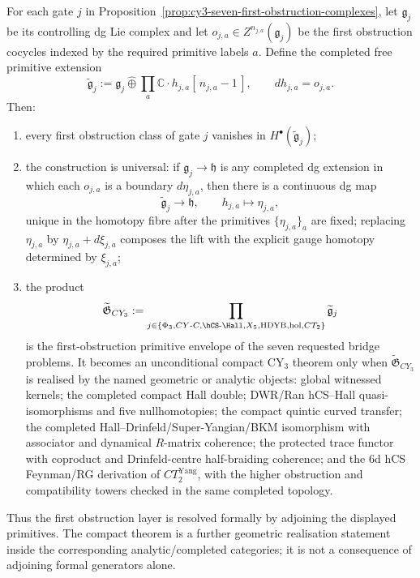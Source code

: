 \begin{theorem}
\label{thm:cy3-universal-primitive-envelope}
For each gate $j$ in
Proposition~\ref{prop:cy3-seven-first-obstruction-complexes}, let
$\mathfrak g_j$ be its controlling dg Lie complex and let
$o_{j,a}\in Z^{n_{j,a}}(\mathfrak g_j)$ be the first obstruction
cocycles indexed by the required primitive labels $a$. Define the
completed free primitive extension
\[
 \widetilde{\mathfrak g}_j
 :=
 \mathfrak g_j
 \widehat{\oplus}
 \prod_a \mathbb C\cdot h_{j,a}[\,n_{j,a}-1\,],
 \qquad
 d h_{j,a}=o_{j,a}.
\]
Then:
\begin{enumerate}[label=\textup{(\roman*)}]
\item every first obstruction class of gate $j$ vanishes in
$H^\bullet(\widetilde{\mathfrak g}_j)$;
\item the construction is universal: if
$\mathfrak g_j\to \mathfrak h$ is any completed dg extension in which
each $o_{j,a}$ is a boundary $d\eta_{j,a}$, then there is a continuous
dg map
\[
 \widetilde{\mathfrak g}_j\longrightarrow\mathfrak h,\qquad
 h_{j,a}\longmapsto \eta_{j,a},
\]
unique in the homotopy fibre after the primitives
$\{\eta_{j,a}\}_a$ are fixed; replacing
$\eta_{j,a}$ by $\eta_{j,a}+d\xi_{j,a}$ composes the lift with the
explicit gauge homotopy determined by $\xi_{j,a}$;
\item the product
\[
 \widetilde{\mathfrak G}_{CY_3}
 :=
 \prod_{j\in\{\Phi_3,CY\textup{-}C,\hCS\textup{-}\Hall,
 X_5,\mathrm{HDYB},\mathrm{hol},CT_2\}}
 \widetilde{\mathfrak g}_j
\]
is the first-obstruction primitive envelope of the seven requested bridge
problems. It becomes an unconditional compact CY$_3$ theorem only when
$\widetilde{\mathfrak G}_{CY_3}$ is realised by the named geometric or
analytic objects: global witnessed kernels; the completed compact Hall
double; DWR/Ran hCS--Hall quasi-isomorphisms and five nullhomotopies;
the compact quintic curved transfer; the completed
Hall--Drinfeld/Super-Yangian/BKM isomorphism with associator and
dynamical $R$-matrix coherence; the protected trace functor with
coproduct and Drinfeld-centre half-braiding coherence; and the 6d hCS
Feynman/RG derivation of
$CT_2^{\mathrm{Yang}}$, with the higher obstruction and compatibility
towers checked in the same completed topology.
\end{enumerate}
Thus the first obstruction layer is resolved formally by adjoining the
displayed primitives. The compact theorem is a further geometric
realisation statement inside the corresponding analytic/completed
categories; it is not a consequence of adjoining formal generators
alone.
\end{theorem}

